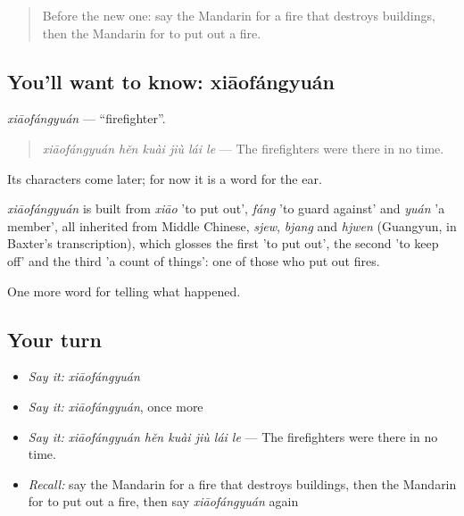 \label{lesson:ZH-C298-xiaofangyuan}



\begin{quote}
Before the new one: say the Mandarin for a fire that destroys buildings, then the Mandarin for to put out a fire.
\end{quote}

\subsection*{You'll want to know: xiāofángyuán}
\emph{xiāofángyuán} — \textquotedblleft{}firefighter\textquotedblright{}.

\begin{quote}
\emph{xiāofángyuán hěn kuài jiù lái le} — The firefighters were there in no time.
\end{quote}

Its characters come later; for now it is a word for the ear.

\begin{cousinweb}
\emph{xiāofángyuán} is built from \emph{xiāo} 'to put out', \emph{fáng} 'to guard against' and \emph{yuán} 'a member', all inherited from Middle Chinese, \emph{sjew}, \emph{bjang} and \emph{hjwen} (Guangyun, in Baxter's transcription), which glosses the first 'to put out', the second 'to keep off' and the third 'a count of things': one of those who put out fires.
\end{cousinweb}

\begin{grammarlens}[title={What you've built}]
One more word for telling what happened.
\end{grammarlens}

\subsection*{Your turn}
\begin{itemize}
\raggedright
  \item \emph{Say it:} \emph{xiāofángyuán}
  \item \emph{Say it:} \emph{xiāofángyuán}, once more
  \item \emph{Say it:} \emph{xiāofángyuán hěn kuài jiù lái le} — The firefighters were there in no time.
  \item \emph{Recall:} say the Mandarin for a fire that destroys buildings, then the Mandarin for to put out a fire, then say \emph{xiāofángyuán} again
\end{itemize}

